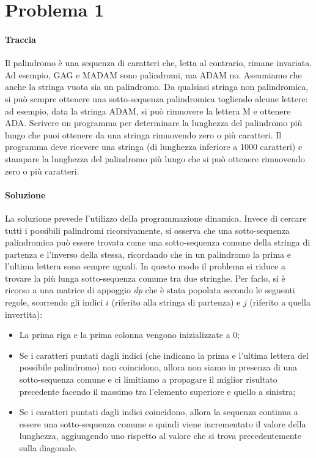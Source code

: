 \documentclass{article}
\begin{document}

\thispagestyle{empty}
\newpage

\section{Problema 1}
\paragraph{Traccia} Il palindromo è una sequenza di caratteri che, letta al contrario, rimane invariata. Ad
esempio, GAG e MADAM sono palindromi, ma ADAM no. Assumiamo che anche la stringa
vuota sia un palindromo. Da qualsiasi stringa non palindromica, si può sempre ottenere una
sotto-sequenza palindromica togliendo alcune lettere: ad esempio, data la stringa ADAM,
si può rimuovere la lettera M e ottenere ADA. Scrivere un programma per determinare la
lunghezza del palindromo più lungo che puoi ottenere da una stringa rimuovendo zero o
più caratteri. Il programma deve ricevere una stringa (di lunghezza inferiore a 1000
caratteri) e stampare la lunghezza del palindromo più lungo che si può ottenere rimuovendo
zero o più caratteri.

\paragraph{Soluzione}

La soluzione prevede l'utilizzo della programmazione dinamica. Invece di cercare tutti i possibili palindromi ricorsivamente, si osserva che una sotto-sequenza palindromica può essere trovata come una sotto-sequenza comune della stringa di partenza e l'inverso della stessa, ricordando che in un palindromo la prima e l'ultima lettera sono sempre uguali. In questo modo il problema si riduce a trovare la più lunga sotto-sequenza comune tra due stringhe. Per farlo, si è ricorso a una matrice di appoggio \textit{dp} che è stata popolata secondo le seguenti regole, scorrendo gli indici $i$ (riferito alla stringa di partenza) e $j$ (riferito a quella invertita):
\begin{itemize}
\item La prima riga e la prima colonna vengono inizializzate a 0;
\item Se i caratteri puntati dagli indici  (che indicano la prima e l'ultima lettera del possibile palindromo) non coincidono, allora non siamo in presenza di una sotto-sequenza comune e ci limitiamo a propagare il miglior risultato precedente facendo il massimo tra l'elemento superiore e quello a sinistra;
\item Se i caratteri puntati dagli indici coincidono, allora la sequenza continua a essere una sotto-sequenza comune e quindi viene incrementato il valore della lunghezza, aggiungendo uno rispetto al valore che si trova precedentemente sulla diagonale.
\end{itemize}
\end{document}
